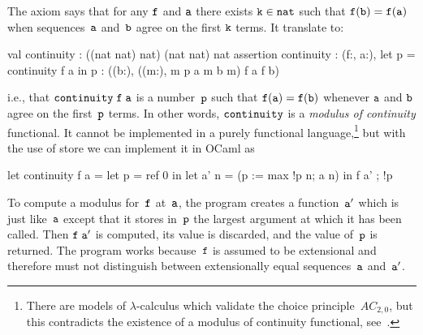 The axiom says that for any $\mathtt{f}$ and $\mathtt{a}$ there exists $\mathtt{k} \in
\mathtt{nat}$ such that $\mathtt{f(b) = f(a)}$ when sequences~$\mathtt{a}$
and~$\mathtt{b}$ agree on the first $\mathtt{k}$ terms. It translate to:
%
\begin{source}
val continuity : ((nat \iTo nat) \iTo nat) \iTo (nat \iTo nat) \iTo nat
assertion continuity :
  \iForall (f:, a:),
    let p = continuity f a in p :  \iAnd
    (\iForall (b:),
       (\iForall (m:),  m \iLeq p \iTo a m  b m) \iTo f a  f b)
\end{source}
%
i.e., that $\mathtt{continuity\;f\;a}$ is a number~$\mathtt{p}$ such that
$\mathtt{f(a) = f(b)}$ whenever $\mathtt{a}$ and $\mathtt{b}$ agree on the first~$\mathtt{p}$ terms. In
other words, $\mathtt{continuity}$ is a \emph{modulus of continuity}
functional. It cannot be implemented in a purely functional
language,\footnote{There are models of $\lambda$-calculus which validate
  the choice principle~$AC_{2,0}$, but this contradicts the
  existence of a modulus of continuity functional,
  see~\cite[9.6.10]{Troelstra:van-Dalen:88:2}.} but with the use of
store we can implement it in OCaml as
%
\begin{source}
let continuity f a = let p = ref 0 in
                     let a' n = (p := max !p n; a n) in
                       f a' ; !p
\end{source}
%
To compute a modulus for~$\mathtt{f}$ at~$\mathtt{a}$, the program creates a
function~$\mathtt{a'}$ which is just like~$\mathtt{a}$ except that it stores in~$\mathtt{p}$ the
largest argument at which it has been called. Then $\mathtt{f\;a'}$ is
computed, its value is discarded, and the value of~$\mathtt{p}$ is returned.
The program works because~$\mathtt{f}$ is assumed to be extensional and
therefore must not distinguish between extensionally equal sequences~$\mathtt{a}$
and~$\mathtt{a'}$.



